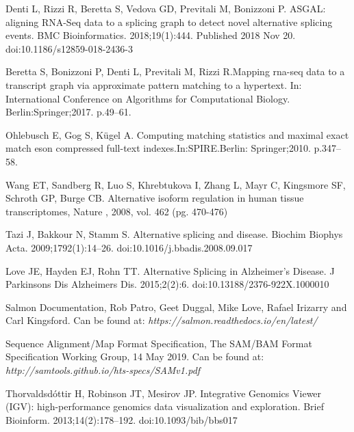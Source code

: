 \documentclass[a4paper,12pt]{article}
\begin{document}
		\begin{thebibliography}{9}

			Denti L, Rizzi R, Beretta S, Vedova GD, Previtali M, Bonizzoni P. ASGAL: aligning RNA-Seq data to a splicing graph to detect novel alternative splicing events. BMC Bioinformatics. 2018;19(1):444. Published 2018 Nov 20. doi:10.1186/s12859-018-2436-3
			
 Beretta S, Bonizzoni P, Denti L, Previtali M, Rizzi R.Mapping rna-seq data to a transcript graph via approximate pattern matching to a hypertext. In: International Conference on Algorithms for Computational Biology. Berlin:Springer;2017. p.49–61. 
 
 Ohlebusch E, Gog S, Kügel A. Computing matching statistics and maximal exact match eson compressed full-text indexes.In:SPIRE.Berlin: Springer;2010. p.347–58. 
			
				Wang ET,  Sandberg R,  Luo S,  Khrebtukova I,  Zhang L,  Mayr C,  Kingsmore SF,  Schroth GP,  Burge CB. Alternative isoform regulation in human tissue transcriptomes, Nature , 2008, vol. 462 (pg. 470-476)
				
Tazi J, Bakkour N, Stamm S. Alternative splicing and disease. Biochim Biophys Acta. 2009;1792(1):14–26. doi:10.1016/j.bbadis.2008.09.017
							
			Love JE, Hayden EJ, Rohn TT. Alternative Splicing in Alzheimer's Disease. J Parkinsons Dis Alzheimers Dis. 2015;2(2):6. doi:10.13188/2376-922X.1000010
			
			Salmon Documentation, Rob Patro, Geet Duggal, Mike Love, Rafael Irizarry and Carl Kingsford. Can be found at: \textit{https://salmon.readthedocs.io/en/latest/}
			
			Sequence Alignment/Map Format Specification, The SAM/BAM Format Specification Working Group, 14 May 2019. Can be found at: \textit{http://samtools.github.io/hts-specs/SAMv1.pdf}
			
			Thorvaldsdóttir H, Robinson JT, Mesirov JP. Integrative Genomics Viewer (IGV): high-performance genomics data visualization and exploration. Brief Bioinform. 2013;14(2):178–192. doi:10.1093/bib/bbs017
			
		\end{thebibliography}
\end{document}
